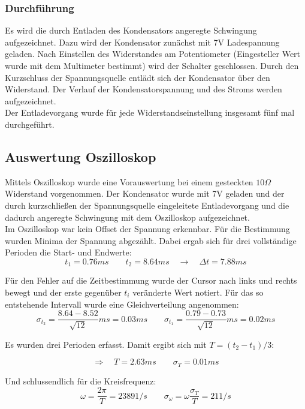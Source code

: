 \documentclass[12pt,a4paper]{article}
\begin{document}
\subsubsection{Durchführung}
Es wird die durch Entladen des Kondensators angeregte Schwingung aufgezeichnet. Dazu wird der Kondensator zunächst mit 7V Ladespannung geladen. Nach Einstellen des Widerstandes am Potentiometer (Eingesteller Wert wurde mit dem Multimeter bestimmt) wird der Schalter geschlossen. Durch den Kurzschluss der Spannungsquelle entlädt sich der Kondensator über den Widerstand. Der Verlauf der Kondensatorspannung und des Stroms werden aufgezeichnet.\\
Der Entladevorgang wurde für jede Widerstandseinstellung insgesamt fünf mal durchgeführt.

\subsection{Auswertung Oszilloskop}
Mittels Oszilloskop wurde eine Vorauswertung bei einem gesteckten $10\Omega$ Widerstand vorgenommen. Der Kondensator wurde mit 7V geladen und der durch kurzschließen der Spannungsquelle eingeleitete Entladevorgang und die dadurch angeregte Schwingung mit dem Oszilloskop aufgezeichnet.\\
Im Oszilloskop war kein Offset der Spannung erkennbar. Für die Bestimmung wurden Minima der Spannung abgezählt. Dabei ergab sich für drei vollständige Perioden die Start- und Endwerte:
\begin{equation}
t_1=0.76ms \quad \quad t_2=8.64ms \quad \rightarrow \quad \Delta t=7.88ms
\end{equation}

Für den Fehler auf die Zeitbestimmung wurde der Cursor nach links und rechts bewegt und der erste gegenüber $t_i$ veränderte Wert notiert. Für das so entstehende Intervall wurde eine Gleichverteilung angenommen:
\begin{equation}
\sigma_{t_2}=\frac{8.64-8.52}{\sqrt{12}}ms=0.03ms \quad \quad 
\sigma_{t_1}=\frac{0.79-0.73}{\sqrt{12}}ms=0.02ms
\end{equation}

Es wurden drei Perioden erfasst. Damit ergibt sich mit $T=(t_2-t_1)/3$:

\begin{equation}
\Rightarrow \quad T=2.63ms \quad \quad \sigma_T=0.01ms
\end{equation}

Und schlussendlich für die Kreisfrequenz:
\begin{equation}
\omega=\frac{2\pi}{T}=2389 1/s \quad \quad \sigma_{\omega}=\omega \frac{\sigma_T}{T}=21 1/s
\end{equation}
\end{document}
